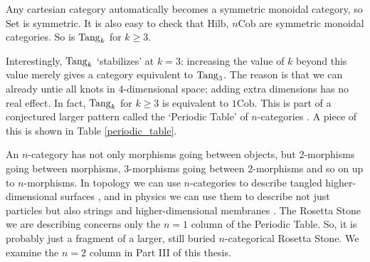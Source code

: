 \documentclass[12pt,twoside,openright]{report}
\newcommand{\Cob}{\mathrm{Cob}}
\newcommand{\Hilb}{\mathrm{Hilb}}
\newcommand{\Set}{\mathrm{Set}}
\newcommand{\Tang}{{\rm Tang}}
\begin{document}
Any cartesian category automatically becomes a symmetric monoidal category, so $\Set$ is symmetric.  It is also easy to check that
$\Hilb$, $n\Cob$ are symmetric monoidal categories.  So is $\Tang_k$ 
for $k \ge 3$.   

Interestingly, $\Tang_k$ `stabilizes' at $k = 3$: increasing the value of $k$ beyond this value merely gives a category equivalent to
$\Tang_3$.  The reason is that we can already untie all knots in
4-dimensional space; adding extra dimensions has no real effect. In fact, $\Tang_k$ for $k \ge 3$ is equivalent to $1\Cob$. This is part of a conjectured larger pattern called the `Periodic Table' of $n$-categories \cite{HDATQFT}.  A piece of this is shown in Table \ref{periodic_table}.

An $n$-category has not only morphisms going between objects, but 
2-morphisms going between morphisms, 3-morphisms going between 
2-morphisms and so on up to $n$-morphisms.  In topology we can use $n$-categories to describe tangled higher-dimensional surfaces
\cite{HDA4}, and in physics we can use them to describe not just particles but also strings and higher-dimensional membranes \cite{HDATQFT,BL}. The Rosetta Stone we are describing concerns only the $n = 1$ column of the Periodic Table.   So, it is probably just a fragment of a larger, still buried $n$-categorical Rosetta Stone.  We examine the $n=2$ column in Part III of this thesis.
\end{document}
